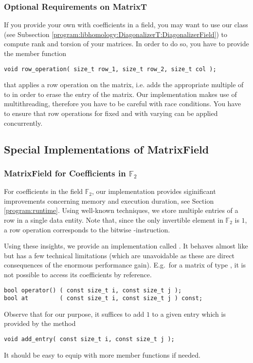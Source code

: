 \subsubsection{Optional Requirements on MatrixT}
\label{program:libhomology:MatrixT:optionals}
If you provide your own  with coefficients in a field, you may want to use our class  (see Subsection \ref{program:libhomology:DiagonalizerT:DiagonalizerField}) to compute rank and torsion of your matrices.
In order to do so, you have to provide the member function
\begin{lstlisting}
void row_operation( size_t row_1, size_t row_2, size_t col );
\end{lstlisting}
that applies a row operation on the matrix, 
i.e. adds the appropriate multiple of  to  in order to erase the entry  of the matrix.
Our implementation makes use of multithreading, therefore you have to be careful with race conditions.
You have to ensure that row operations for fixed  and  with varying  can be applied concurrently.

\subsection{Special Implementations of MatrixField}
\label{program:libhomology:MatrixT:MatrixField_for_F_2_and_css}
\subsubsection{MatrixField for Coefficients in \texorpdfstring{$\mathbb F_2$}{Z/2Z}}
For coefficients in the field $\mathbb F_2$, our implementation provides siginificant improvements concerning memory and execution duration, see Section \ref{program:runtime}.
Using well-known techniques, we store multiple entries of a row in a single data entity.
Note that, since the only invertible element in $\mathbb F_2$ is $1$, a row operation corresponds to the bitwise -instruction.

Using these insights, we provide an implementation called .
It behaves almost like  but has a few technical limitations (which are unavoidable as these are direct consequences of the enormous performance gain).
E.g.\ for a matrix of type , it is not possible to access its coefficients by reference.
\begin{lstlisting}
bool operator() ( const size_t i, const size_t j );
bool at         ( const size_t i, const size_t j ) const;
\end{lstlisting}
Observe that for our purpose, it suffices to add $1$ to a given entry which is provided by the method
\begin{lstlisting}
void add_entry( const size_t i, const size_t j );
\end{lstlisting}
It should be easy to equip  with more member functions if needed.

